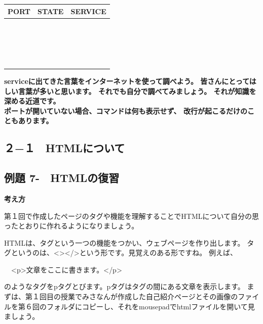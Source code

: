 \documentclass[a4paper,12pt,dvipdfmx]{jarticle}
\newcounter{Exercise}
\renewcommand\theExercise{例題 7-\arabic{Exercise}}
\begin{document}
\begin{flushleft}
	\tablefirsthead{}
	\tablehead{}
	\tabletail{}
	\tablelasttail{}
	\begin{supertabular}{|m{5.467cm}|m{5.4690003cm}|m{5.155cm}|}
		\hline
		PORT &
		STATE &
		SERVICE\\\hline
		~
		&
		~
		&
		~
		\\\hline
		~
		&
		~
		&
		~
		\\\hline
		~
		&
		~
		&
		~
		\\\hline
		~
		&
		~
		&
		~
		\\\hline
	\end{supertabular}
\end{flushleft}
{\bfseries
serviceに出てきた言葉をインターネットを使って調べよう。
皆さんにとってはしい言葉が多いと思います。
それでも自分で調べてみましょう。
それが知識を深める近道です。\\
ポートが開いていない場合、コマンドは何も表示せず、
改行が起こるだけのこともあります。
}

\clearpage\subsection*{２−１　HTMLについて}
\subsection*{\theExercise　HTMLの復習}
{\bfseries
	考え方\newline

	第１回で作成したページのタグや機能を理解することでHTMLについて自分の思ったとおりに作れるようになりましょう。}


\bigskip

HTMLは、タグという一つの機能をつかい、ウェブページを作り出します。\newline
タグというのは、{\textless}{\textgreater}{\textless}/{\textgreater}という形です。見覚えのある形ですね。\newline
例えば、

\ \ {\textless}p{\textgreater}文章をここに書きます。{\textless}/p{\textgreater}

のようなタグをpタグとびます。pタグはタグの間にある文章を表示します。\newline
まずは、第１回目の授業でみさなんが作成した自己紹介ページとその画像のファイルを第６回のフォルダにコピーし、それをmousepadでhtmlファイルを開いて見ましょう。
\end{document}

